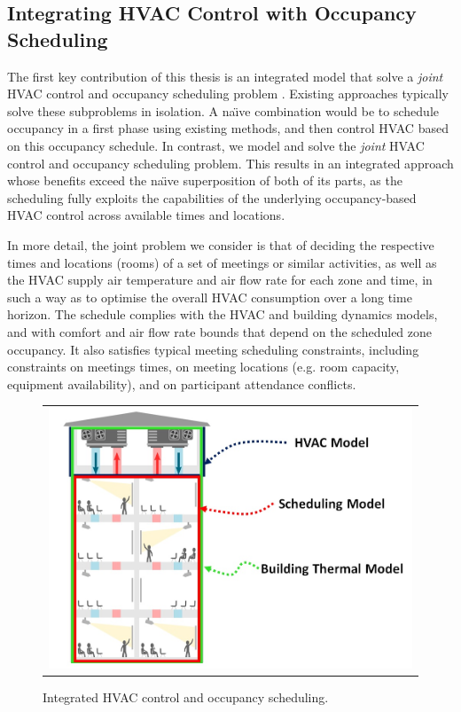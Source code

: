 \subsection{Integrating HVAC Control with Occupancy Scheduling}

The first key contribution of this thesis is an integrated model that solve a \emph{joint} HVAC control and occupancy scheduling problem \citep{lim2015hvac}. Existing approaches typically solve these subproblems in isolation. A na\"{\i}ve combination would be to schedule occupancy in a first phase using existing methods, and then control HVAC based on this occupancy schedule. In contrast, we model and solve the {\em joint} HVAC control and occupancy scheduling problem. This results in an integrated approach whose benefits exceed the na\"{\i}ve superposition of both of its parts, as the scheduling fully exploits the capabilities of the underlying occupancy-based HVAC control across available times and locations.

In more detail, the joint problem we consider is that of deciding the respective times and locations (rooms) of a set of meetings or similar
activities, as well as the HVAC supply air temperature and air flow rate for each zone and time, in such a way as to optimise the overall
HVAC consumption over a long time horizon. The schedule complies with the HVAC and building dynamics models, and with comfort and air flow
rate bounds that depend on the scheduled zone occupancy. It also satisfies typical meeting scheduling constraints, including constraints on meetings times, on meeting locations (e.g. room capacity, equipment availability), and on participant attendance conflicts. 

\begin{figure}[ht]
\centering
\begin{tabular}{c}
\includegraphics[width=5in,keepaspectratio]{figs/intro_three_models.jpg}
\end{tabular}
\caption{Integrated HVAC control and occupancy scheduling.}
\label{intro:three_models}
\end{figure}

